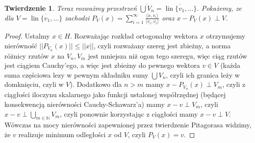 \documentclass[11pt]{mwrep}
\renewcommand{\[}{\begin{equation}}
\renewcommand{\]}{\end{equation}}
\newcommand{\lin}{\operatorname{lin}}
\newtheorem{twr}[subsection]{Twierdzenie}%
\begin{document}
\begin{twr}
	Teraz rozważmy przestrzeń $\overline{\bigcup V_n} = \overline{\lin\{v_1,\ldots\}}$.
	Pokażemy, ze dla $V= \overline{\lin\{v_1,\ldots\}}$ zachodzi $P_V(x) = \sum_{i=1}^\infty \frac{\langle x,v_i \rangle}{\langle v_i,v_i \rangle}$
	oraz $x- P_V(x) \perp V$.
\end{twr}

\begin{proof}
	Ustalmy $x\in H$. Rozważając rozkład ortogonalny wektora $x$ otrzymujemy nierówność $||P_{V_n}(x)||\leq||x||$, czyli rozważany szereg jest zbieżny, a norma różnicy rzutów $x$ na $V_n,V_m$ jest mniejsza niż ogon tego szeregu, więc ciąg rzutów jest ciągiem Cauchy'ego, a więc jest zbieżny do pewnego wektora $v\in V$ (każda suma częściowa lezy w pewnym składniku sumy $\bigcup V_n$, czyli ich granica leży w domknięciu, czyli w $V$). Dodatkowo dla $n>m$ mamy $x-P_{V_n}(x)\perp V_m$, czyli z ciągłości iloczynu skalarnego jako funkcji ustalonej współrzędnej (będącej konsekwencją nierówności Cauchy-Schawarz'a) mamy $x-v\perp V_m$, czyli $x-v\perp \bigcup\limits_{m\in\mathbb{N}}V_m$, czyli ponownie korzystając z ciągłości mamy $x-v\perp V$. Wówczas na mocy nierówności zapewnionej przez twierdzenie Pitagorasa widzimy, że $v$ realizuje minimum odległości $x$ od $V$, czyli  $P_V(x)=v$.
\end{proof}
\end{document}
